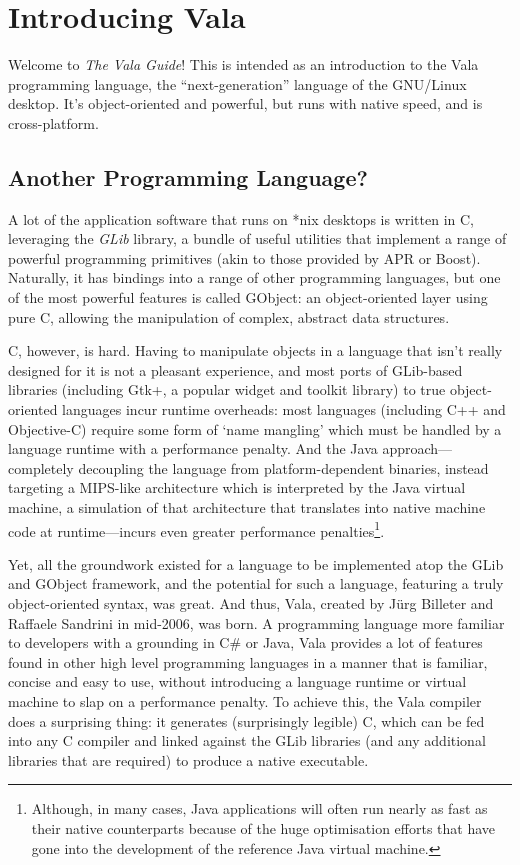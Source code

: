 \chapter{Introducing Vala}

Welcome to \emph{The Vala Guide}!  This is intended as an introduction to the
Vala programming language, the ``next-generation'' language of the GNU/Linux
desktop.  It's object-oriented and powerful, but runs with native speed, and
is cross-platform.

\section{Another Programming Language?}

A lot of the application software that runs on *nix desktops is written in C,
leveraging the \emph{GLib} library, a bundle of useful utilities that
implement a range of powerful programming primitives (akin to those provided
by APR or Boost).  Naturally, it has bindings into a range of other
programming languages, but one of the most powerful features is called
GObject: an object-oriented layer using pure C, allowing the manipulation of
complex, abstract data structures.

C, however, is hard.  Having to manipulate objects in a language that isn't
really designed for it is not a pleasant experience, and most ports of
GLib-based libraries (including Gtk+, a popular widget and toolkit library) to
true object-oriented languages incur runtime overheads: most languages
(including C++ and Objective-C) require some form of `name mangling' which
must be handled by a language runtime with a performance penalty.  And the
Java approach---completely decoupling the language from platform-dependent
binaries, instead targeting a MIPS-like architecture which is interpreted by
the Java virtual machine, a simulation of that architecture that translates
into native machine code at runtime---incurs even greater performance
penalties\footnote{Although, in many cases, Java applications will often run
  nearly as fast as their native counterparts because of the huge optimisation
  efforts that have gone into the development of the reference Java virtual
  machine.}.

Yet, all the groundwork existed for a language to be implemented atop the GLib
and GObject framework, and the potential for such a language, featuring a
truly object-oriented syntax, was great.  And thus, Vala, created by J\"u{}rg
Billeter and Raffaele Sandrini in mid-2006, was born.  A programming language
more familiar to developers with a grounding in C\# or Java, Vala provides a
lot of features found in other high level programming languages in a manner
that is familiar, concise and easy to use, without introducing a language
runtime or virtual machine to slap on a performance penalty.  To achieve this,
the Vala compiler does a surprising thing: it generates (surprisingly legible)
C, which can be fed into any C compiler and linked against the GLib libraries
(and any additional libraries that are required) to produce a native
executable.

